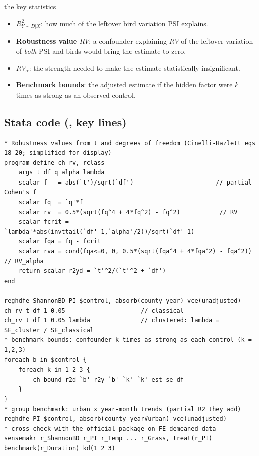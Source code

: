 \documentclass[11pt]{article}
\begin{document}
\begin{conceptbox}{the key statistics}
\begin{itemize}[leftmargin=12pt]
\item $R^2_{Y\sim D|X}$: how much of the leftover bird variation PSI explains.
\item \textbf{Robustness value $RV$}: a confounder explaining $RV$ of the leftover variation of \emph{both} PSI and birds would bring the estimate to zero.
\item \textbf{$RV_\alpha$}: the strength needed to make the estimate statistically insignificant.
\item \textbf{Benchmark bounds}: the adjusted estimate if the hidden factor were $k$ times as strong as an observed control.
\end{itemize}
\end{conceptbox}

\subsection*{Stata code (, key lines)}
\begin{lstlisting}
* Robustness values from t and degrees of freedom (Cinelli-Hazlett eqs 18-20; simplified for display)
program define ch_rv, rclass
    args t df q alpha lambda
    scalar f   = abs(`t')/sqrt(`df')                       // partial Cohen's f
    scalar fq  = `q'*f
    scalar rv  = 0.5*(sqrt(fq^4 + 4*fq^2) - fq^2)           // RV
    scalar fcrit = `lambda'*abs(invttail(`df'-1,`alpha'/2))/sqrt(`df'-1)
    scalar fqa = fq - fcrit
    scalar rva = cond(fqa<=0, 0, 0.5*(sqrt(fqa^4 + 4*fqa^2) - fqa^2))  // RV_alpha
    return scalar r2yd = `t'^2/(`t'^2 + `df')
end

reghdfe ShannonBD PI $control, absorb(county year) vce(unadjusted)
ch_rv t df 1 0.05                     // classical
ch_rv t df 1 0.05 lambda              // clustered: lambda = SE_cluster / SE_classical
* benchmark bounds: confounder k times as strong as each control (k = 1,2,3)
foreach b in $control {
    foreach k in 1 2 3 {
        ch_bound r2d_`b' r2y_`b' `k' `k' est se df
    }
}
* group benchmark: urban x year-month trends (partial R2 they add)
reghdfe PI $control, absorb(county year#urban) vce(unadjusted)
* cross-check with the official package on FE-demeaned data
sensemakr r_ShannonBD r_PI r_Temp ... r_Grass, treat(r_PI) benchmark(r_Duration) kd(1 2 3)
\end{lstlisting}
\end{document}
